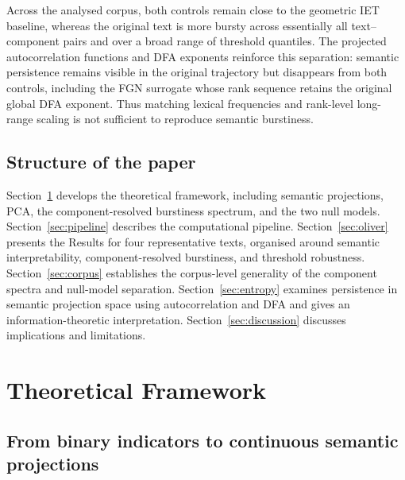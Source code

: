 \documentclass[12pt,a4paper]{article}
\begin{document}
Across the analysed corpus, both controls remain close to the geometric
IET baseline, whereas the original text is more bursty across essentially
all text--component pairs and over a broad range of threshold quantiles.
The projected autocorrelation functions and DFA exponents reinforce this
separation: semantic persistence remains visible in the original
trajectory but disappears from both controls, including the FGN
surrogate whose rank sequence retains the original global DFA exponent.
Thus matching lexical frequencies and rank-level long-range scaling is
not sufficient to reproduce semantic burstiness.
 

\subsection{Structure of the paper}

Section~\ref{sec:theory} develops the theoretical framework, including
semantic projections, PCA, the component-resolved burstiness spectrum,
and the two null models. Section~\ref{sec:pipeline} describes the
computational pipeline. Section~\ref{sec:oliver} presents the Results
for four representative texts, organised around semantic
interpretability, component-resolved burstiness, and threshold
robustness. Section~\ref{sec:corpus} establishes the corpus-level
generality of the component spectra and null-model separation.
Section~\ref{sec:entropy} examines persistence in semantic projection
space using autocorrelation and DFA and gives an information-theoretic
interpretation. Section~\ref{sec:discussion} discusses implications
and limitations.

\section{Theoretical Framework}
\label{sec:theory}

\subsection{From binary indicators to continuous semantic projections}
\label{sec:observables}
\end{document}
